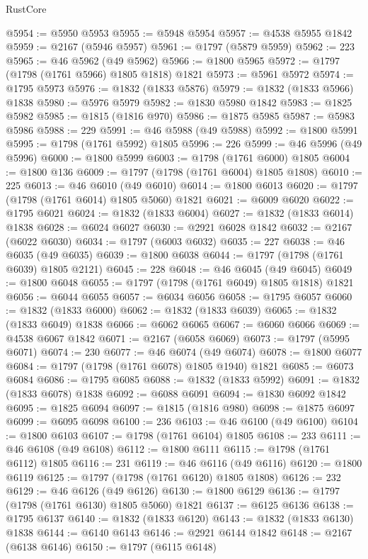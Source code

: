 \begin{lexlean}{RustCore}
\begin{coremodule}
@5954 := @5950 @5953
@5955 := @5948 @5954
@5957 := @4538 @5955 @1842
@5959 := @2167 (@5946 @5957)
@5961 := @1797 (@5879 @5959)
@5962 := 223
@5965 := @46 @5962 (@49 @5962)
@5966 := @1800 @5965
@5972 := @1797 (@1798 (@1761 @5966) @1805 @1818) @1821
@5973 := @5961 @5972
@5974 := @1795 @5973
@5976 := @1832 (@1833 @5876)
@5979 := @1832 (@1833 @5966) @1838
@5980 := @5976 @5979
@5982 := @1830 @5980 @1842
@5983 := @1825 @5982
@5985 := @1815 (@1816 @970)
@5986 := @1875 @5985
@5987 := @5983 @5986
@5988 := 229
@5991 := @46 @5988 (@49 @5988)
@5992 := @1800 @5991
@5995 := @1798 (@1761 @5992) @1805
@5996 := 226
@5999 := @46 @5996 (@49 @5996)
@6000 := @1800 @5999
@6003 := @1798 (@1761 @6000) @1805
@6004 := @1800 @136
@6009 := @1797 (@1798 (@1761 @6004) @1805 @1808)
@6010 := 225
@6013 := @46 @6010 (@49 @6010)
@6014 := @1800 @6013
@6020 := @1797 (@1798 (@1761 @6014) @1805 @5060) @1821
@6021 := @6009 @6020
@6022 := @1795 @6021
@6024 := @1832 (@1833 @6004)
@6027 := @1832 (@1833 @6014) @1838
@6028 := @6024 @6027
@6030 := @2921 @6028 @1842
@6032 := @2167 (@6022 @6030)
@6034 := @1797 (@6003 @6032)
@6035 := 227
@6038 := @46 @6035 (@49 @6035)
@6039 := @1800 @6038
@6044 := @1797 (@1798 (@1761 @6039) @1805 @2121)
@6045 := 228
@6048 := @46 @6045 (@49 @6045)
@6049 := @1800 @6048
@6055 := @1797 (@1798 (@1761 @6049) @1805 @1818) @1821
@6056 := @6044 @6055
@6057 := @6034 @6056
@6058 := @1795 @6057
@6060 := @1832 (@1833 @6000)
@6062 := @1832 (@1833 @6039)
@6065 := @1832 (@1833 @6049) @1838
@6066 := @6062 @6065
@6067 := @6060 @6066
@6069 := @4538 @6067 @1842
@6071 := @2167 (@6058 @6069)
@6073 := @1797 (@5995 @6071)
@6074 := 230
@6077 := @46 @6074 (@49 @6074)
@6078 := @1800 @6077
@6084 := @1797 (@1798 (@1761 @6078) @1805 @1940) @1821
@6085 := @6073 @6084
@6086 := @1795 @6085
@6088 := @1832 (@1833 @5992)
@6091 := @1832 (@1833 @6078) @1838
@6092 := @6088 @6091
@6094 := @1830 @6092 @1842
@6095 := @1825 @6094
@6097 := @1815 (@1816 @980)
@6098 := @1875 @6097
@6099 := @6095 @6098
@6100 := 236
@6103 := @46 @6100 (@49 @6100)
@6104 := @1800 @6103
@6107 := @1798 (@1761 @6104) @1805
@6108 := 233
@6111 := @46 @6108 (@49 @6108)
@6112 := @1800 @6111
@6115 := @1798 (@1761 @6112) @1805
@6116 := 231
@6119 := @46 @6116 (@49 @6116)
@6120 := @1800 @6119
@6125 := @1797 (@1798 (@1761 @6120) @1805 @1808)
@6126 := 232
@6129 := @46 @6126 (@49 @6126)
@6130 := @1800 @6129
@6136 := @1797 (@1798 (@1761 @6130) @1805 @5060) @1821
@6137 := @6125 @6136
@6138 := @1795 @6137
@6140 := @1832 (@1833 @6120)
@6143 := @1832 (@1833 @6130) @1838
@6144 := @6140 @6143
@6146 := @2921 @6144 @1842
@6148 := @2167 (@6138 @6146)
@6150 := @1797 (@6115 @6148)

\end{coremodule}
\end{lexlean}
